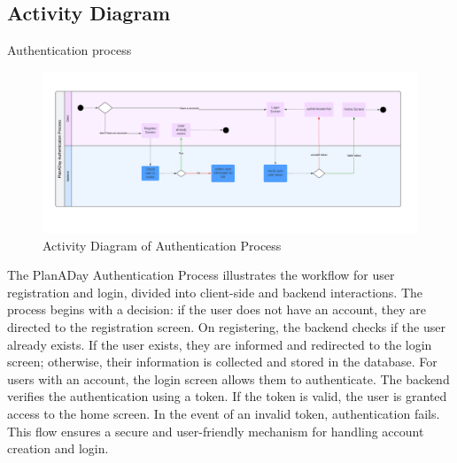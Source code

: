 \newpage
\subsection{Activity Diagram}
Authentication process
\begin{figure}[!h]
    \centering
    \includegraphics[width=1\linewidth]{chapter3/authentication-process.png}
    \caption{Activity Diagram of Authentication Process}
    \label{fig:Activity Diagram of Authentication Process}
\end{figure}
\par
The PlanADay Authentication Process illustrates the workflow for user registration and login,
divided into client-side and backend interactions. The process begins with a decision: if the user
does not have an account, they are directed to the registration screen. On registering, the backend
checks if the user already exists. If the user exists, they are informed and redirected to the login
screen; otherwise, their information is collected and stored in the database. For users with an
account, the login screen allows them to authenticate. The backend verifies the authentication
using a token. If the token is valid, the user is granted access to the home screen. In the event of
an invalid token, authentication fails. This flow ensures a secure and user-friendly mechanism
for handling account creation and login.

